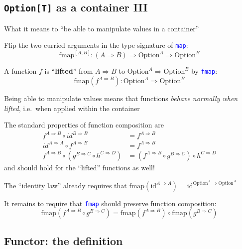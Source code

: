 \subsection{\texttt{Option{[}T{]}} as a container III}

What it means to ``be able to manipulate values in a container''

Flip the two curried arguments in the type signature of \texttt{\textcolor{blue}{\footnotesize{}map}}:{\footnotesize{}
\[
\text{fmap}^{[A,B]}:\left(A\Rightarrow B\right)\Rightarrow\text{Option}^{A}\Rightarrow\text{Option}^{B}
\]
}{\footnotesize\par}

A function $f$ is ``\textbf{lifted}'' from $A\Rightarrow B$ to
$\text{Option}^{A}\Rightarrow\text{Option}^{B}$ by \texttt{\textcolor{blue}{\footnotesize{}fmap}}:{\footnotesize{}
\[
\text{fmap}(f^{A\Rightarrow B}):\text{Option}^{A}\Rightarrow\text{Option}^{B}
\]
}{\footnotesize\par}

Being able to manipulate values means that functions \emph{behave
normally when lifted}, i.e.\ when applied within the container

The standard properties of function composition are{\footnotesize{}
\begin{align*}
f^{A\Rightarrow B}\circ id^{B\Rightarrow B} & =f^{A\Rightarrow B}\\
id^{A\Rightarrow A}\circ f^{A\Rightarrow B} & =f^{A\Rightarrow B}\\
f^{A\Rightarrow B}\circ(g^{B\Rightarrow C}\circ h^{C\Rightarrow D}) & =(f^{A\Rightarrow B}\circ g^{B\Rightarrow C})\circ h^{C\Rightarrow D}
\end{align*}
}and should hold for the ``lifted'' functions as well!

The ``identity law'' already requires that {\footnotesize{}$\text{fmap}(\text{id}^{A\Rightarrow A})=\text{id}^{\text{Option}^{A}\Rightarrow\text{Option}^{A}}$}{\footnotesize\par}

It remains to require that \texttt{\textcolor{blue}{\footnotesize{}fmap}}
should preserve function composition:{\footnotesize{}
\[
\text{fmap}(f^{A\Rightarrow B}\circ g^{B\Rightarrow C})=\text{fmap}(f^{A\Rightarrow B})\circ\text{fmap}(g^{B\Rightarrow C})
\]
}{\footnotesize\par}


\subsection{Functor: the definition}

